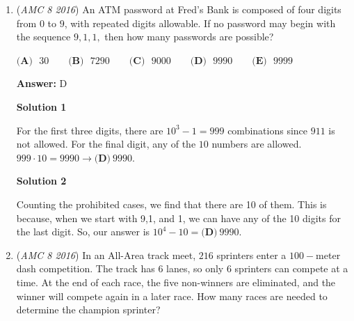 \begin{enumerate}
Each lap Bonnie runs, Annie runs another quarter lap, so Bonnie will run four laps before she is overtaken because it takes 4 of $\frac{1}{4}$ of the total lap. to total one lap. When Bonnie runs 4 laps, Annie has gained one full lap and would overtake Bonnie. That means Annie will have run $\boxed{\textbf{(D)}\ 5 }$ laps.

 



\textbf{Solution 2}

Saying that Bonnie runs 40 meters per second, then Annie will run 50 meters per second. It will take Bonnie 10 seconds to run 1 lap and it would take 8 seconds for Annie to do 1 lap. The LCM of 8 and 10 is 40. In 40 seconds Bonnie will do 4 laps and Annie will do 5 laps. Since Annie did 1 more lap she passed Bonnie. So the answer is $\boxed{\textbf{(D)}\ 5 }$ laps.

 


	\item (\textit{AMC 8 2016}) An ATM password at Fred's Bank is composed of four digits from $0$ to $9$, with repeated digits allowable. If no password may begin with the sequence $9,1,1,$ then how many passwords are possible?


 $\textbf{(A)}\mbox{ }30\qquad\textbf{(B)}\mbox{ }7290\qquad\textbf{(C)}\mbox{ }9000\qquad\textbf{(D)}\mbox{ }9990\qquad\textbf{(E)}\mbox{ }9999$

 \textbf{Answer: }D



\textbf{Solution 1}

For the first three digits, there are $10^3-1=999$ combinations since $911$ is not allowed. For the final digit, any of the $10$ numbers are allowed. $999 \cdot 10 = 9990 \rightarrow \boxed{\textbf{(D)}\ 9990}$.

 



\textbf{Solution 2}

Counting the prohibited cases, we find that there are 10 of them. This is because, when we start with 9,1, and 1, we can have any of the 10 digits for the last digit. So, our answer is $10^4-10=\boxed{\textbf{(D)}\ 9990}.$



	\item (\textit{AMC 8 2016}) In an All-Area track meet, $216$ sprinters enter a $100-$meter dash competition. The track has $6$ lanes, so only $6$ sprinters can compete at a time. At the end of each race, the five non-winners are eliminated, and the winner will compete again in a later race. How many races are needed to determine the champion sprinter?



\end{enumerate}
